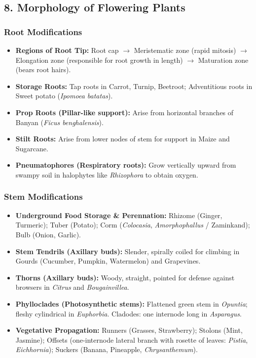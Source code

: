 \documentclass[11pt,a4paper]{article}
\begin{document}
\subsection{8. Morphology of Flowering Plants}

\subsubsection{Root Modifications}
\begin{itemize}[leftmargin=1.5em, itemsep=2pt]
  \item \textbf{Regions of Root Tip:} Root cap $\to$ Meristematic zone (rapid mitosis) $\to$ Elongation zone (responsible for root growth in length) $\to$ Maturation zone (bears root hairs).
  \item \textbf{Storage Roots:} Tap roots in Carrot, Turnip, Beetroot; Adventitious roots in Sweet potato (\textit{Ipomoea batatas}).
  \item \textbf{Prop Roots (Pillar-like support):} Arise from horizontal branches of Banyan (\textit{Ficus benghalensis}).
  \item \textbf{Stilt Roots:} Arise from lower nodes of stem for support in Maize and Sugarcane.
  \item \textbf{Pneumatophores (Respiratory roots):} Grow vertically upward from swampy soil in halophytes like \textit{Rhizophora} to obtain oxygen.
\end{itemize}

\subsubsection{Stem Modifications}
\begin{itemize}[leftmargin=1.5em, itemsep=2pt]
  \item \textbf{Underground Food Storage \& Perennation:} Rhizome (Ginger, Turmeric); Tuber (Potato); Corm (\textit{Colocasia}, \textit{Amorphophallus} / Zaminkand); Bulb (Onion, Garlic).
  \item \textbf{Stem Tendrils (Axillary buds):} Slender, spirally coiled for climbing in Gourds (Cucumber, Pumpkin, Watermelon) and Grapevines.
  \item \textbf{Thorns (Axillary buds):} Woody, straight, pointed for defense against browsers in \textit{Citrus} and \textit{Bougainvillea}.
  \item \textbf{Phylloclades (Photosynthetic stems):} Flattened green stem in \textit{Opuntia}; fleshy cylindrical in \textit{Euphorbia}. Cladodes: one internode long in \textit{Asparagus}.
  \item \textbf{Vegetative Propagation:} Runners (Grasses, Strawberry); Stolons (Mint, Jasmine); Offsets (one-internode lateral branch with rosette of leaves: \textit{Pistia}, \textit{Eichhornia}); Suckers (Banana, Pineapple, \textit{Chrysanthemum}).
\end{itemize}
\end{document}
